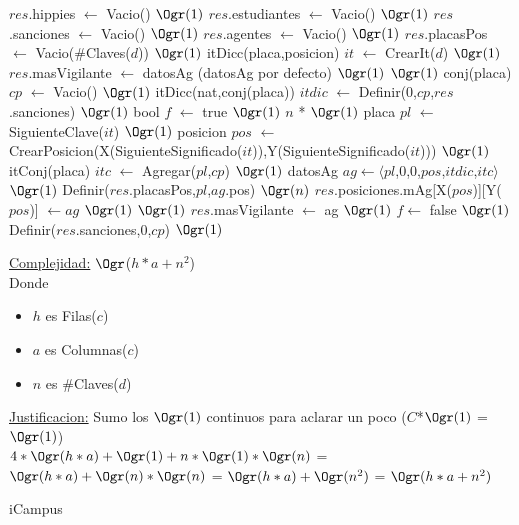 \begin{Representacion}
\begin{Algoritmos}
\begin{algorithm}[H]
\begin{algorithmic}[1]
	\State $res$.hippies $\gets$ Vacio() \Comment $\Ogr(1)$
	\State $res$.estudiantes $\gets$ Vacio() \Comment $\Ogr(1)$
	\State $res$.sanciones $\gets$ Vacio() \Comment $\Ogr(1)$
	\State $res$.agentes $\gets$ Vacio() \Comment $\Ogr(1)$
	\State $res$.placasPos $\gets$ Vacio($\#$Claves($d$)) \Comment $\Ogr(1)$ %
	\State itDicc(placa,posicion) $it$ $\gets$ CrearIt($d$) \Comment $\Ogr(1)$
	\State $res$.masVigilante $\gets$ datosAg \Comment (datosAg por defecto) $\Ogr(1)$ 
	 \Comment $\Ogr(1)$
		\State conj(placa) $cp$ $\gets$ Vacio() \Comment $\Ogr(1)$
		\State itDicc(nat,conj(placa)) $itdic$ $\gets$ Definir(0,$cp$,$res$.sanciones) \Comment $\Ogr(1)$
		\State bool $f$ $\gets$ true \Comment $\Ogr(1)$
		 \Comment $n$ * $\Ogr(1)$
	 	\State placa $pl$ $\gets$ SiguienteClave($it$) \Comment $\Ogr(1)$
	 	\State posicion $pos$ $\gets$ CrearPosicion(X(SiguienteSignificado($it$)),Y(SiguienteSignificado($it$))) \Comment $\Ogr(1)$
	 	\State itConj(placa) $itc$ $\gets$ Agregar($pl$,$cp$) \Comment $\Ogr(1)$
	 	\State datosAg $ag \gets \langle pl$,0,0,$pos$,$itdic$,$itc \rangle$ \Comment $\Ogr(1)$
	 	\State Definir($res$.placasPos,$pl$,$ag$.pos) \Comment $\Ogr(n)$
	 	\State $res$.posiciones.mAg[X($pos$)][Y($pos$)] $\gets ag$ \Comment $\Ogr(1)$
	 	 \Comment $\Ogr(1)$
	 		\State $res$.masVigilante $\gets$ ag \Comment $\Ogr(1)$
	 		\State $f \gets$ false \Comment $\Ogr(1)$
	 	\EndIf
	 \EndWhile
	 \State Definir($res$.sanciones,0,$cp$) \Comment $\Ogr(1)$ %
	 \EndIf
\EndProcedure
\end{algorithmic}

\underline{Complejidad:} $\Ogr$($h*a + n^2$)\\
Donde 
\begin{itemize}
	\item $h$ es Filas($c$)
	\item $a$ es Columnas($c$)
	\item $n$ es $\#$Claves($d$)
\end{itemize}	
\underline{Justificacion:} Sumo los $\Ogr(1)$ continuos para aclarar un poco ($C$*$\Ogr(1)$ = $\Ogr(1)$)\\
$4*\Ogr(h*a) + \Ogr(1) + n * \Ogr(1) * \Ogr(n)$ = $\Ogr(h*a) + \Ogr(n)*\Ogr(n)$ = $\Ogr(h*a) + \Ogr(n^2)$ = $\Ogr(h*a + n^2)$
\end{algorithm}


\begin{algorithm}[H]
\caption{iCampus}


\end{algorithm}
\end{Algoritmos}
\end{Representacion}
